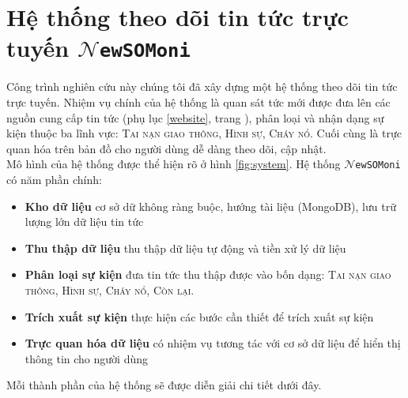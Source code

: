 \section{Hệ thống theo dõi tin tức trực tuyến  $\mathcal{N}$\texttt{ewSOMoni}}
\label{system}
\noindent Công trình nghiên cứu này chúng tôi đã xây dựng một hệ thống theo dõi tin tức trực tuyến. Nhiệm vụ chính của hệ thống là quan sát tức mới được đưa lên các nguồn cung cấp tin tức (phụ lục \ref{website}, trang \pageref{website}), phân loại và nhận dạng  sự kiện thuộc ba lĩnh vực: \textsc{Tai nạn giao thông}, \textsc{Hình sự}, \textsc{Cháy nổ}. Cuối cùng là trực quan hóa trên bản đồ cho người dùng dễ dàng theo dõi, cập nhật. \\
\noindent Mô hình của hệ thống được thể hiện rõ ở hình \ref{fig:system}. Hệ thống $\mathcal{N}$\texttt{ewSOMoni} có năm  phần chính:
\begin{itemize}
  \item \textbf{Kho dữ liệu} cơ sở dữ không ràng buộc, hướng tài liệu (MongoDB), lưu trữ lượng  lớn dữ liệu tin tức

\item \textbf{Thu thập dữ liệu} thu thập dữ liệu tự động và tiền xử lý dữ liệu
  \item \textbf{Phân loại sự kiện} đưa  tin tức thu thập được vào bốn dạng: \textsc{Tai nạn giao thông}, \textsc{Hình sự}, \textsc{Cháy nổ}, \textsc{Còn lại}.


  \item \textbf{Trích xuất sự kiện} thực hiện các bước cần thiết để trích xuất sự kiện
  \item \textbf{Trực quan hóa dữ liệu} có nhiệm vụ tương tác với cơ sở dữ liệu để hiển thị thông tin cho người dùng
 \end{itemize}

\noindent Mỗi thành phần của hệ thống sẽ được diễn giải chi tiết dưới đây.

